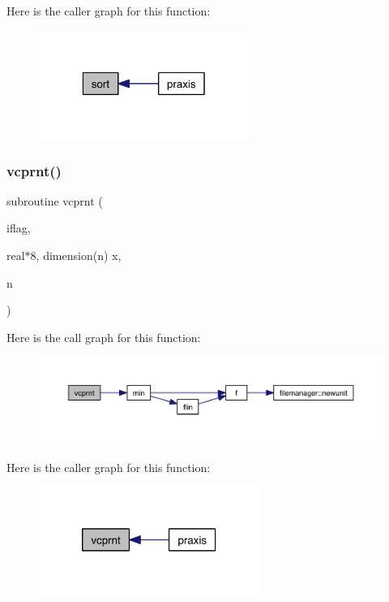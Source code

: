 Here is the caller graph for this function\+:\nopagebreak
\begin{figure}[H]
\begin{center}
\leavevmode
\includegraphics[width=194pt]{praxis_8f_a462bf29e7634caebf340f472d7b13bd0_icgraph}
\end{center}
\end{figure}
\mbox{\label{praxis_8f_a45854e864f31f82eb39cae6a2882c883}} 
\subsubsection{\texorpdfstring{vcprnt()}{vcprnt()}}
{\footnotesize\ttfamily subroutine vcprnt (\begin{DoxyParamCaption}\item[{}]{iflag,  }\item[{real$\ast$8, dimension(n)}]{x,  }\item[{}]{n }\end{DoxyParamCaption})}

Here is the call graph for this function\+:\nopagebreak
\begin{figure}[H]
\begin{center}
\leavevmode
\includegraphics[width=350pt]{praxis_8f_a45854e864f31f82eb39cae6a2882c883_cgraph}
\end{center}
\end{figure}
Here is the caller graph for this function\+:\nopagebreak
\begin{figure}[H]
\begin{center}
\leavevmode
\includegraphics[width=204pt]{praxis_8f_a45854e864f31f82eb39cae6a2882c883_icgraph}
\end{center}
\end{figure}
